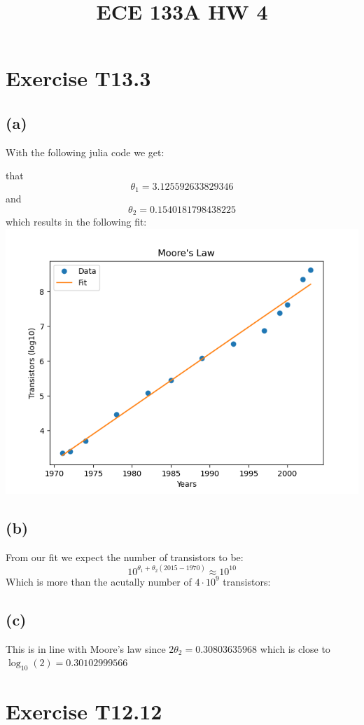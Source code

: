 
\title{ECE 133A HW 4}

\maketitle
\section*{Exercise T13.3}
\subsection*{(a)}
With the following julia code we get:

that 
$$\theta_1=3.125592633829346$$
and 
$$\theta_2=0.1540181798438225$$
which results in the following fit:\\
\includegraphics[scale=0.5]{"Moore's Law.png"}
\subsection*{(b)}
From our fit we expect the number of transistors to be:
$$10^{\theta_1+\theta_2(2015-1970)}\approx 10^{10}$$
Which is more than the acutally number of $4\cdot 10^9$ transistors:
\subsection*{(c)}
This is in line with Moore's law since
$2\theta_2=0.30803635968$ which is close to $\log_{10}(2)=0.30102999566$
\section*{Exercise T12.12}
